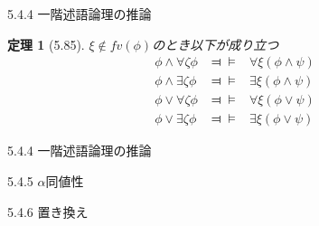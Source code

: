 \documentclass[dvipdfmx,11pt]{beamer}
\newtheorem{theo}[theorem]{定理}
\begin{document}
\begin{frame}{5.4.4 一階述語論理の推論}
  \begin{theo}[5.85]
    \(\xi\not\in\textit{fv}(\phi)\)のとき以下が成り立つ
    \begin{eqnarray*}
      \phi\wedge\forall\zeta\phi & \Dashv\vDash & \forall\xi(\phi\wedge\psi) \\
      \phi\wedge\exists\zeta\phi & \Dashv\vDash & \exists\xi(\phi\wedge\psi) \\
      \phi\vee\forall\zeta\phi & \Dashv\vDash & \forall\xi(\phi\vee\psi) \\
      \phi\vee\exists\zeta\phi & \Dashv\vDash & \exists\xi(\phi\vee\psi)
    \end{eqnarray*}
  \end{theo}
\end{frame}

\begin{frame}{5.4.4 一階述語論理の推論}
\end{frame}

\begin{frame}{5.4.5 \(\alpha\)同値性}
\end{frame}

\begin{frame}{5.4.6 置き換え}
\end{frame}
\end{document}
